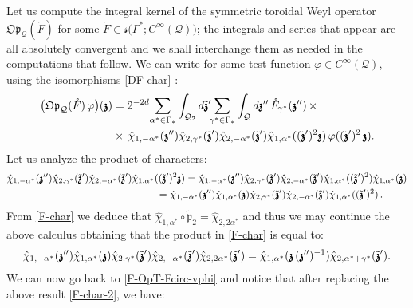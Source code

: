 \documentclass[12pt]{article}
\theoremstyle{definition}
\def\Op{\mathfrak{Op}}
\def\T{\mathcal{Q}}
\def\p{\mathfrak{p}}
\def\bz{\mathfrak{z}\hspace*{-4pt}\mathfrak{z}}
\numberwithin{equation}{section}
\begin{document}
Let us compute the integral kernel of the symmetric toroidal Weyl operator $\Op_{\T}(\mathring{F})$ for some $\mathring{F}\in \mathcal{s}\big(\Gamma^*;C^\infty(\T)\big)$; the integrals and series that appear are all absolutely convergent and we shall interchange them as needed in the computations that follow. We can write  for some test function $\varphi\in C^\infty(\T)$, using the isomorphisms \eqref{DF-char} :
\begin{align}\label{F-OpT-Fcirc-vphi}
	\big(\Op_{\T}(\mathring{F})\,\varphi\big)(\bz)&=2^{-2d}\underset{\alpha^*\in\Gamma_*}{\sum}\int_{\T_2}d\tilde{\bz}'\hspace*{-2pt}\underset{\gamma^*\in\Gamma_*}{\sum}\int_{\T}d\bz''\,\mathring{F}_{\gamma^*}(\bz'')\,\times \\ \nonumber
	&\times\,\hat{\chi}_{1,-\alpha^*}(\bz'')\hat{\chi}_{2,\gamma^*}(\tilde{\bz}')\hat{\chi}_{2,-\alpha^*}(\tilde{\bz}')\hat{\chi}_{1,\alpha^*}((\tilde{\bz}')^2\bz)\,\varphi((\tilde{\bz}')^2\,\bz).
\end{align}
Let us analyze the product of characters:
\begin{align}\nonumber
\hat{\chi}_{1,-\alpha^*}(\bz'')\hat{\chi}_{2,\gamma^*}(\tilde{\bz}')\hat{\chi}_{2,-\alpha^*}(\tilde{\bz}')\hat{\chi}_{1,\alpha^*}((\tilde{\bz}')^2\bz)&=\hat{\chi}_{1,-\alpha^*}(\bz'')\hat{\chi}_{2,\gamma^*}(\tilde{\bz}')\hat{\chi}_{2,-\alpha^*}(\tilde{\bz}')\hat{\chi}_{1,\alpha^*}((\tilde{\bz}')^2)\hat{\chi}_{1,\alpha^*}(\bz)\\ \label{F-char}
&\hspace*{-1cm}=\hat{\chi}_{1,-\alpha^*}(\bz'')\hat{\chi}_{1,\alpha^*}(\bz)\hat{\chi}_{2,\gamma^*}(\tilde{\bz}')\hat{\chi}_{2,-\alpha^*}(\tilde{\bz}')\hat{\chi}_{1,\alpha^*}((\tilde{\bz}')^2)\,.
\end{align}
From \eqref{F-char} we deduce that $\hat{\chi}_{1,\alpha^*}\circ\tilde{\p}_2=\hat{\chi}_{2,2\alpha^*}$ and thus we may continue the above calculus obtaining that the product in \eqref{F-char} is equal to:
\begin{align}\label{F-char-2}
\hat{\chi}_{1,-\alpha^*}(\bz'')\hat{\chi}_{1,\alpha^*}(\bz)\hat{\chi}_{2,\gamma^*}(\tilde{\bz}')\hat{\chi}_{2,-\alpha^*}(\tilde{\bz}')\hat{\chi}_{2,2\alpha^*}(\tilde{\bz}')=\hat{\chi}_{1,\alpha^*}(\bz\,(\bz'')^{-1})\hat{\chi}_{2,\alpha^*+\gamma^*}(\tilde{\bz}').
\end{align}
We can now  go  back to \eqref{F-OpT-Fcirc-vphi} and notice that after replacing the above result \eqref{F-char-2}, we have:
\end{document}
